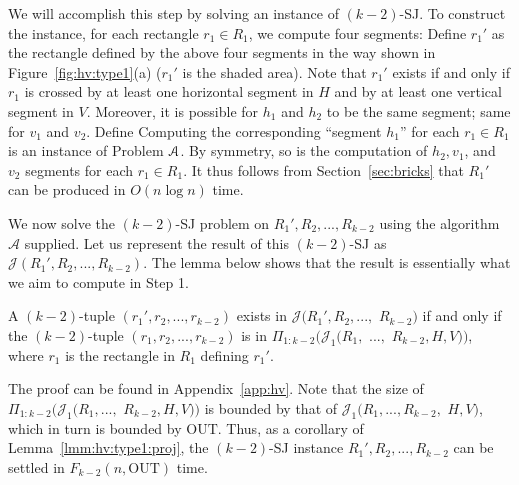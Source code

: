 \documentclass[sigconf]{acmart}
\def\vgap{\vspace{1mm}}
\def\A{\mathcal{A}}
\def\J{\mathcal{J}}
\def\out{\mathrm{OUT}}
\begin{document}
 We will accomplish this step by solving an instance of $(k-2)$-SJ. To construct the instance, for each rectangle $r_1 \in R_1$, we compute four segments:
Define $r_1'$ as the rectangle defined by the above four segments in the way shown in Figure~\ref{fig:hv:type1}(a) ($r_1'$ is the shaded area). Note that $r_1'$ exists if and only if $r_1$ is crossed by at least one horizontal segment in $H$ and by at least one vertical segment in $V$. Moreover, it is possible for $h_1$ and $h_2$ to be the same segment; same for $v_1$ and $v_2$. Define
Computing the corresponding ``segment $h_1$'' for each $r_1 \in R_1$ is an instance of Problem $\EuScript{A}$. By symmetry, so is the computation of $h_2, v_1$, and $v_2$ segments for each $r_1 \in R_1$. It thus follows from Section~\ref{sec:bricks} that $R_1'$ can be produced in $O(n \log n)$ time.

\vgap

We now solve the $(k-2)$-SJ problem on $R_1', R_2, ..., R_{k-2}$ using the algorithm $\A$ supplied. Let us represent the result of this $(k-2)$-SJ as $\J(R_1', R_2, ..., R_{k-2})$. The lemma below shows that the result is essentially what we aim to compute in Step 1.

\begin{lemma} \label{lmm:hv:type1:proj}
    A $(k-2)$-tuple $(r_1', r_2, ..., r_{k-2})$ exists in $\J(R_1', R_2, ...,$ $R_{k-2})$ if and only if the $(k-2)$-tuple $(r_1, r_2, ..., r_{k-2})$ is in $\Pi_{1:k-2}(\J_1(R_1,$ $...,$ $R_{k-2}, H, V))$, where $r_1$ is the rectangle in $R_1$ defining $r_1'$.
\end{lemma}

The proof can be found in Appendix~\ref{app:hv}. Note that the size of $\Pi_{1:k-2}(\J_1(R_1, ...,$ $R_{k-2}, H, V))$ is bounded by that of $\J_1(R_1, ..., R_{k-2},$ $H, V)$, which in turn is bounded by $\out$. Thus, as a corollary of Lemma~\ref{lmm:hv:type1:proj}, the $(k-2)$-SJ instance $R_1', R_2, ..., R_{k-2}$  can be settled in $F_{k-2}(n, \out)$ time.
\end{document}
